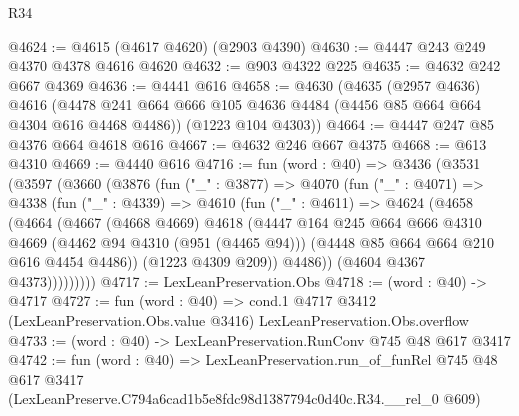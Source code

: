 \begin{lexlean}{R34}
\begin{coremodule}
@4624 := @4615 (@4617 @4620) (@2903 @4390)
@4630 := @4447 @243 @249 @4370 @4378 @4616 @4620
@4632 := @903 @4322 @225
@4635 := @4632 @242 @667 @4369
@4636 := @4441 @616
@4658 := @4630
    (@4635
      (@2957 @4636)
      @4616
      (@4478 @241 @664 @666 @105 @4636 @4484 (@4456 @85 @664 @664 @4304 @616 @4468 @4486))
      (@1223 @104 @4303))
@4664 := @4447 @247 @85 @4376 @664 @4618 @616
@4667 := @4632 @246 @667 @4375
@4668 := @613 @4310
@4669 := @4440 @616
@4716 := fun (word : @40) =>
  @3436
    (@3531
      (@3597
        (@3660
          (@3876
            (fun ("_" : @3877) =>
            @4070
              (fun ("_" : @4071) =>
              @4338
                (fun ("_" : @4339) =>
                @4610
                  (fun ("_" : @4611) =>
                  @4624
                    (@4658
                      (@4664
                        (@4667
                          (@4668 @4669)
                          @4618
                          (@4447
                            @164
                            @245
                            @664
                            @666
                            @4310
                            @4669
                            (@4462 @94 @4310 (@951 (@4465 @94)))
                            (@4448 @85 @664 @664 @210 @616 @4454 @4486))
                          (@1223 @4309 @209))
                        @4486))
                    (@4604 @4367 @4373)))))))))
@4717 := LexLeanPreservation.Obs
@4718 := (word : @40) -> @4717
@4727 := fun (word : @40) =>
  cond.{1} @4717 @3412 (LexLeanPreservation.Obs.value @3416) LexLeanPreservation.Obs.overflow
@4733 := (word : @40) -> LexLeanPreservation.RunConv @745 @48 @617 @3417
@4742 := fun (word : @40) =>
  LexLeanPreservation.run_of_funRel
    @745
    @48
    @617
    @3417
    (LexLeanPreserve.C794a6cad1b5e8fdc98d1387794c0d40c.R34.__rel_0 @609)
\end{coremodule}
\end{lexlean}
